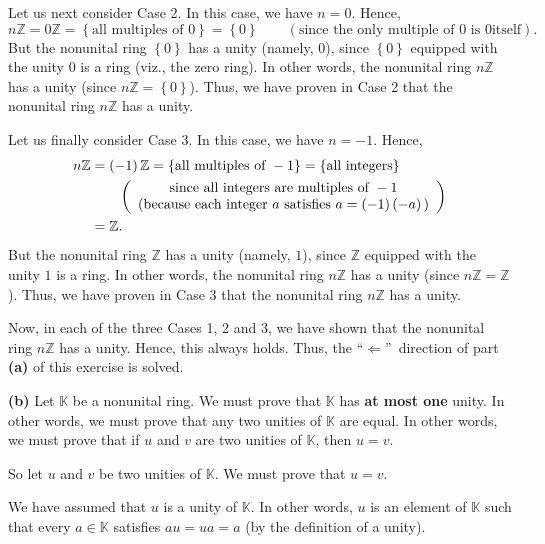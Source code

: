 \documentclass[paper=a4, fontsize=12pt]{scrartcl}%
\theoremstyle{plainsl}
\theoremstyle{definition}
\theoremstyle{remark}
\begin{document}
Let us next consider Case 2. In this case, we have $n=0$. Hence,%
\[
n\mathbb{Z}=0\mathbb{Z}=\left\{  \text{all multiples of }0\right\}  =\left\{
0\right\}  \qquad\left(  \text{since the only multiple of }0\text{ is }0\text{
itself}\right)  .
\]
But the nonunital ring $\left\{  0\right\}  $ has a unity (namely, $0$), since
$\left\{  0\right\}  $ equipped with the unity $0$ is a ring (viz., the zero
ring). In other words, the nonunital ring $n\mathbb{Z}$ has a unity (since
$n\mathbb{Z}=\left\{  0\right\}  $). Thus, we have proven in Case 2 that the
nonunital ring $n\mathbb{Z}$ has a unity.

Let us finally consider Case 3. In this case, we have $n=-1$. Hence,%
\begin{align*}
n\mathbb{Z}  &  =\left(  -1\right)  \mathbb{Z}=\left\{  \text{all multiples of
}-1\right\}  =\left\{  \text{all integers}\right\} \\
&  \qquad\left(
\begin{array}
[c]{c}%
\text{since all integers are multiples of }-1\\
\text{(because each integer }a\text{ satisfies }a=\left(  -1\right)  \left(
-a\right)  \text{)}%
\end{array}
\right) \\
&  =\mathbb{Z}.
\end{align*}
But the nonunital ring $\mathbb{Z}$ has a unity (namely, $1$), since
$\mathbb{Z}$ equipped with the unity $1$ is a ring. In other words, the
nonunital ring $n\mathbb{Z}$ has a unity (since $n\mathbb{Z}=\mathbb{Z}$).
Thus, we have proven in Case 3 that the nonunital ring $n\mathbb{Z}$ has a unity.

Now, in each of the three Cases 1, 2 and 3, we have shown that the nonunital
ring $n\mathbb{Z}$ has a unity. Hence, this always holds. Thus, the
\textquotedblleft$\Longleftarrow$\textquotedblright\ direction of part
\textbf{(a)} of this exercise is solved.

\bigskip

\textbf{(b)} Let $\mathbb{K}$ be a nonunital ring. We must prove that
$\mathbb{K}$ has \textbf{at most one} unity. In other words, we must prove
that any two unities of $\mathbb{K}$ are equal. In other words, we must prove
that if $u$ and $v$ are two unities of $\mathbb{K}$, then $u=v$.

So let $u$ and $v$ be two unities of $\mathbb{K}$. We must prove that $u=v$.

We have assumed that $u$ is a unity of $\mathbb{K}$. In other words, $u$ is an
element of $\mathbb{K}$ such that every $a\in\mathbb{K}$ satisfies $au=ua=a$
(by the definition of a unity).
\end{document}
